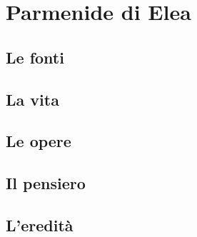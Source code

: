 \chapter{Parmenide di Elea}

\section{Le fonti}

\section{La vita}

\section{Le opere}

\section{Il pensiero}

\section{L'eredità}
